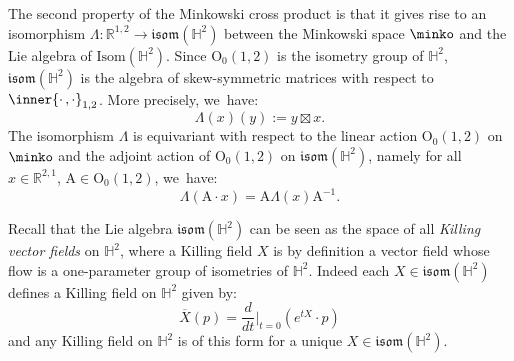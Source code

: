 The second property of the Minkowski cross product is that it gives rise to an isomorphism $\Lambda: \mathbb{R}^{1,2}\to \mathfrak{isom}(\mathbb{H}^2)$ between the Minkowski space $\minko$ and the Lie algebra of $\mathrm{Isom}(\mathbb{H}^2)$. Since $\mathrm{O}_0(1,2)$ is the isometry group of $\mathbb{H}^2$, $\mathfrak{isom}(\mathbb{H}^2)$ is the algebra of skew-symmetric matrices with respect to $\inner{\cdot\,,\cdot}_{1,2}$. More precisely, we~have:\vspace*{-3pt}
\begin{equation}\label{lievskilling}
\Lambda(x)(y):=y\boxtimes x.
\end{equation}
The isomorphism $\Lambda$ is equivariant with respect to the linear action $\mathrm{O}_0(1,2)$ on $\minko$ and the adjoint action of $\mathrm{O}_0(1,2)$ on $\mathfrak{isom}(\mathbb{H}^2)$, namely for all $x\in \mathbb{R}^{2,1}$, $\mathrm{A}\in\mathrm{O}_0(1,2)$, we~have:\vspace*{-3pt}
\begin{equation}\label{adequivariance}
\Lambda(\mathrm{A}\cdot x)=\mathrm{A}\Lambda(x)\mathrm{A}^{-1}.
\end{equation}

Recall that the Lie algebra $\mathfrak{isom}(\mathbb{H}^2)$ can be seen as the space of all \emph{Killing vector fields} on $\mathbb{H}^2$, where a Killing field $X$ is by definition a vector field whose flow is a one-parameter group of isometries of $\mathbb{H}^2$. Indeed each $X\in \mathfrak{isom}(\mathbb{H}^2)$ defines a Killing field on $\mathbb{H}^2$ given by:
\[
\overline{X}(p)=\frac{d}{dt}\Big\lvert_{t=0} (e^{tX}\cdot p)
\]
and any Killing field on $\mathbb{H}^2$ is of this form for a unique $X \in \mathfrak{isom}(\mathbb{H}^2)$.

